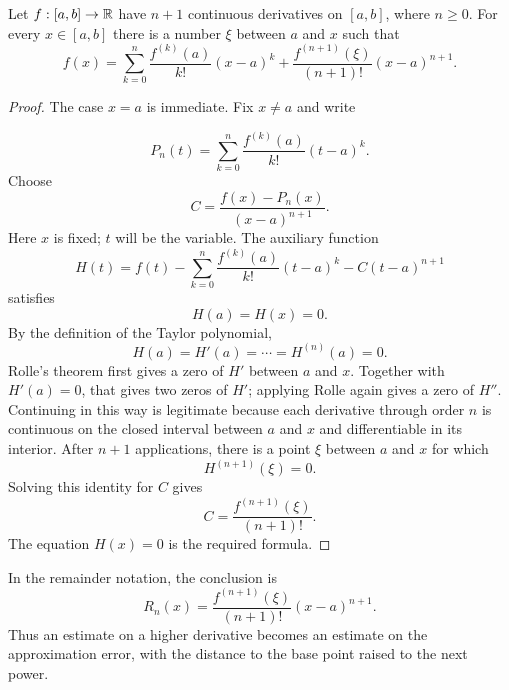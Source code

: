 \begin{theorem}
\label{thm:taylor}
Let $f:[a,b]\to\mathbb{R}$ have $n+1$ continuous derivatives on $[a,b]$, where $n\geq0$. For every $x\in[a,b]$ there is a number $\xi$ between $a$ and $x$ such that
\[
f(x)=\sum_{k=0}^{n}\frac{f^{(k)}(a)}{k!}(x-a)^k
+\frac{f^{(n+1)}(\xi)}{(n+1)!}(x-a)^{n+1}.
\]
\end{theorem}
\begin{proof}
The case $x=a$ is immediate. Fix $x\ne a$ and write

\[
P_n(t)=\sum_{k=0}^n\frac{f^{(k)}(a)}{k!}(t-a)^k.
\]
 Choose
\[
C=\frac{f(x)-P_n(x)}{(x-a)^{n+1}}.
\]
Here $x$ is fixed; $t$ will be the variable. The auxiliary function
\[
H(t)=f(t)-\sum_{k=0}^{n}\frac{f^{(k)}(a)}{k!}(t-a)^k-C(t-a)^{n+1}
\]
satisfies
\[
H(a)=H(x)=0.
\]
By the definition of the Taylor polynomial,
\[
H(a)=H'(a)=\cdots=H^{(n)}(a)=0.
\]
Rolle's theorem first gives a zero of $H'$ between $a$ and $x$. Together with $H'(a)=0$, that gives two zeros of $H'$; applying Rolle again gives a zero of $H''$. Continuing in this way is legitimate because each derivative through order $n$ is continuous on the closed interval between $a$ and $x$ and differentiable in its interior. After $n+1$ applications, there is a point $\xi$ between $a$ and $x$ for which
\[
H^{(n+1)}(\xi)=0.
\]
Solving this identity for $C$ gives
\[
C=\frac{f^{(n+1)}(\xi)}{(n+1)!}.
\]
The equation $H(x)=0$ is the required formula.
\end{proof}

In the remainder notation, the conclusion is
\[
R_n(x)=\frac{f^{(n+1)}(\xi)}{(n+1)!}(x-a)^{n+1}.
\]
Thus an estimate on a higher derivative becomes an estimate on the
approximation error, with the distance to the base point raised to the
next power.

